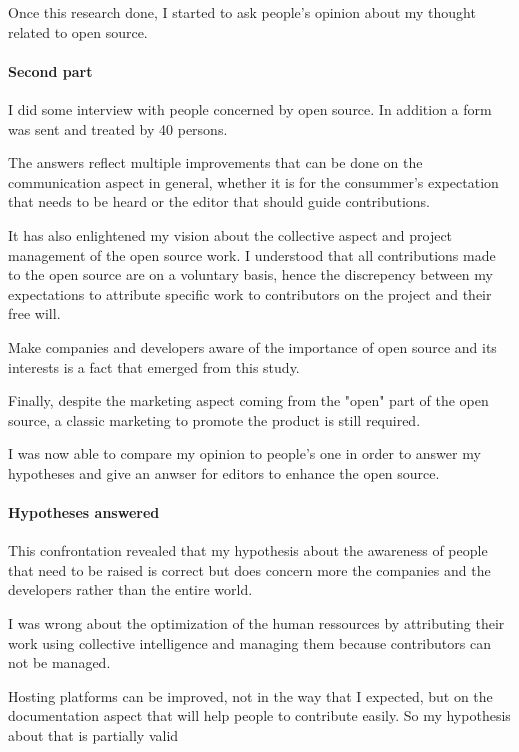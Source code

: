 	Once this research done, I started to ask people's opinion about my thought related to open source.

	\paragraph*{Second part\\}

	I did some interview with people concerned by open source. In addition a form was sent and treated by 40 persons.

	The answers reflect multiple improvements that can be done on the communication aspect in general, whether it is for the consummer's expectation that needs to be heard or the editor that should guide contributions.

	It has also enlightened my vision about the collective aspect and project management of the open source work. I understood that all contributions made to the open source are on a voluntary basis, hence the discrepency between my expectations to attribute specific work to contributors on the project and their free will.

	Make companies and developers aware of the importance of open source and its interests is a fact that emerged from this study.

	Finally, despite the marketing aspect coming from the "open" part of the open source, a classic marketing to promote the product is still required.

	I was now able to compare my opinion to people's one in order to answer my hypotheses and give an anwser for editors to enhance the open source.

	\paragraph*{Hypotheses answered\\}

	This confrontation revealed that my hypothesis about the awareness of people that need to be raised is correct but does concern more the companies and the developers rather than the entire world.

	I was wrong about the optimization of the human ressources by attributing their work using collective intelligence and managing them because contributors can not be managed.

	Hosting platforms can be improved, not in the way that I expected, but on the documentation aspect that will help people to contribute easily. So my hypothesis about that is partially valid

